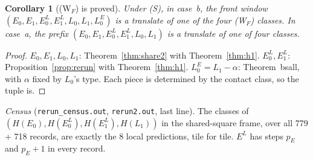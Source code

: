 \documentclass[11pt]{article}
\newtheorem{corollary}[theorem]{Corollary}
\theoremstyle{definition}\newtheorem{definition}[theorem]{Definition}\newtheorem{remark}[theorem]{Remark}
\begin{document}
\begin{corollary}[(W$_F$) is proved]\label{cor:wf}
Under (S), in case~b, the front window $(E_0,E_1,E^L_0,E^L_1,L_0,L_1,L^E_0)$ is a translate of one of the four (W$_F$) classes. In case~a, the prefix $(E_0,E_1,E^L_0,E^L_1,L_0,L_1)$ is a translate of one of four classes.
\end{corollary}
\begin{proof}
$E_0,E_1,L_0,L_1$: Theorem~\ref{thm:share2} with Theorem~\ref{thm:h1}. $E^L_0,E^L_1$: Proposition~\ref{prop:rerun} with Theorem~\ref{thm:h1}. $L^E_0=L_1-\alpha$: Theorem~bsall, with $\alpha$ fixed by $L_0$'s type. Each piece is determined by the contact class, so the tuple is.
\end{proof}
\noindent\emph{Census} (\texttt{rerun\_census.out}, \texttt{rerun2.out}, last line). The classes of $(H(E_0),H(E^L_0),H(E^L_1),H(L_1))$ in the shared-square frame, over all 779 + 718 records, are exactly the 8 local predictions, tile for tile. $E^L$ has steps $p_E$ and $p_E+1$ in every record.
\end{document}
